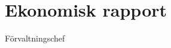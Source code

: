 \documentclass[../_main/handlingar.tex]{subfiles}
\begin{document}
\section{Ekonomisk rapport}
\begin{signatures}{1}
    \mvh
    \signature{Sophia Grimmeiss Grahm}{Förvaltningschef}
\end{signatures}
\end{document}
